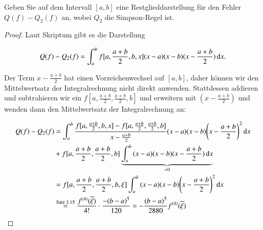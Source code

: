
\begin{exercise}
  Geben Sie auf dem Intervall $[a,b]$ eine Restglieddarstellung für den Fehler $Q(f)-Q_2(f)$ an, wobei $Q_2$ die Simpson-Regel ist.
\end{exercise}
\begin{proof}
  Laut Skriptum gibt es die Darstellung

  \begin{equation*}
    Q(f)-Q_2(f)=\int_a^b{f[a,\frac{a+b}{2},b,x](x-a)(x-b)(x-\frac{a+b}{2}) \dif x}.
  \end{equation*}

  Der Term $x-\frac{a+b}{2}$ hat einen Vorzeichenwechsel auf $[a,b]$, daher können wir den Mittelwertsatz der Integralrechnung nicht direkt anwenden. Stattdessen addieren und subtrahieren wir ein $f[a,\frac{a+b}{2},\frac{a+b}{2},b]$ und erweitern mit $(x-\frac{a+b}{2})$ und wenden dann den Mittelwertsatz der Integralrechnung an:

  \begin{equation*}
    \begin{split}
      Q(f)-Q_2(f)
      &=\int_a^b{\frac{f[a,\frac{a+b}{2},b,x]-f[a,\frac{a+b}{2},\frac{a+b}{2},b]}{x-\frac{a+b}{2}}(x-a)(x-b){\left(x-\frac{a+b}{2}\right)}^2 \dif x} \\
      &+f[a,\frac{a+b}{2},\frac{a+b}{2},b]\underbrace{\int_a^b{(x-a)(x-b)(x-\frac{a+b}{2}) \dif x}}_{=0} \\
      &= f[a,\frac{a+b}{2},\frac{a+b}{2},b,\xi]\int_a^b{(x-a)(x-b){\left(x-\frac{a+b}{2}\right)}^2 \dif x} \\
      &\stackrel{\text{Satz 3.15}}{=} \frac{f^{(4)}(\widetilde{\xi})}{4!} \cdot \frac{-{(b-a)}^5}{120} = -\frac{{(b-a)}^5}{2880} f^{(4)}(\widetilde{\xi})
    \end{split}
  \end{equation*}
\end{proof}
